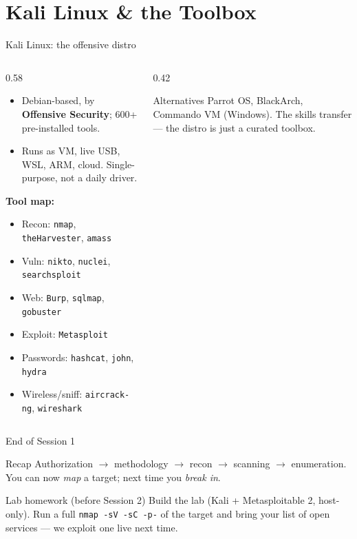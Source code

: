 \documentclass[aspectratio=169,11pt]{beamer}
\begin{document}
\section{Kali Linux \& the Toolbox}
\begin{frame}{Kali Linux: the offensive distro}
  \begin{columns}[T]
    \begin{column}{0.58\textwidth}
      \begin{itemize}
        \item Debian-based, by \textbf{Offensive Security}; 600+ pre-installed
              tools.
        \item Runs as VM, live USB, WSL, ARM, cloud. Single-purpose, not a
              daily driver.
      \end{itemize}
      \textbf{Tool map:}
      \begin{itemize}\footnotesize
        \item Recon: \texttt{nmap}, \texttt{theHarvester}, \texttt{amass}
        \item Vuln: \texttt{nikto}, \texttt{nuclei}, \texttt{searchsploit}
        \item Web: \texttt{Burp}, \texttt{sqlmap}, \texttt{gobuster}
        \item Exploit: \texttt{Metasploit}
        \item Passwords: \texttt{hashcat}, \texttt{john}, \texttt{hydra}
        \item Wireless/sniff: \texttt{aircrack-ng}, \texttt{wireshark}
      \end{itemize}
    \end{column}
    \begin{column}{0.42\textwidth}
      \begin{alertblock}{\footnotesize Alternatives}
        \footnotesize Parrot OS, BlackArch, Commando VM (Windows). The skills
        transfer --- the distro is just a curated toolbox.
      \end{alertblock}
    \end{column}
  \end{columns}
\end{frame}

\begin{frame}{End of Session 1}
  \begin{block}{Recap}
    Authorization $\to$ methodology $\to$ recon $\to$ scanning $\to$ enumeration.
    You can now \emph{map} a target; next time you \emph{break in}.
  \end{block}
  \begin{alertblock}{Lab homework (before Session 2)}
    Build the lab (Kali + Metasploitable 2, host-only). Run a full
    \texttt{nmap -sV -sC -p-} of the target and bring your list of open
    services --- we exploit one live next time.
  \end{alertblock}
\end{frame}
\end{document}
